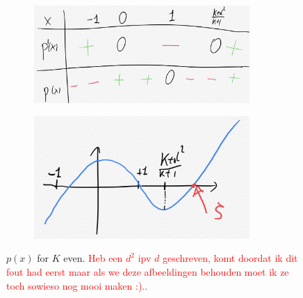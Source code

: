 \documentclass[12pt]{report}
\begin{document}
\begin{figure}[t]
\begin{subfigure}{.45\textwidth}
\centering
\captionsetup{width=.8\linewidth}
\includegraphics[width=0.9\textwidth]{figures/Chapter8/tekenschema_Keven.png}
\label{fig:tails_SQd}
\end{subfigure}
\begin{subfigure}{.45\textwidth}
\centering
\captionsetup{width=.8\linewidth}
\includegraphics[width=0.9\textwidth]{figures/Chapter8/plot_Keven.png}
\end{subfigure}
\caption{$p(x)$ for $K$ even. \textcolor{red}{Heb een $d^2$ ipv $d$ geschreven, komt doordat ik dit fout had eerst maar als we deze afbeeldingen behouden moet ik ze toch sowieso nog mooi maken :)..}} \label{fig:Keven}
\end{figure}
\end{document}
